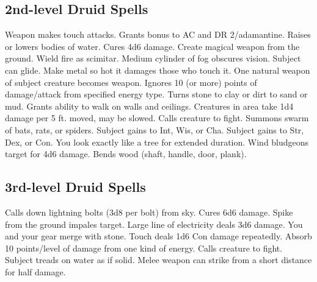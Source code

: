 \subsection{2nd-level Druid Spells}
\begin{spelllist}
   Weapon makes touch attacks. 
   Grants  bonus to AC and DR 2/adamantine.
   Raises or lowers bodies of water.
   Cures 4d6 damage.
   Create magical weapon from the ground.
   Wield fire as scimitar.
   Medium cylinder of fog obscures vision.
   Subject can glide.
   Make metal so hot it damages those who touch it.
   One natural weapon of subject creature becomes  weapon.
   Ignores 10 (or more) points of damage/attack from specified energy type.
   Turns stone to clay or dirt to sand or mud.
   Grants ability to walk on walls and ceilings.
   Creatures in area take 1d4 damage per 5 ft. moved, may be slowed.
   Calls creature to fight.
   Summons swarm of bats, rats, or spiders.
   Subject gains  to Int, Wis, or Cha.
   Subject gains  to Str, Dex, or Con.
   You look exactly like a tree for extended duration.
   Wind bludgeons target for 4d6 damage.
   Bends wood (shaft, handle, door, plank).
\end{spelllist}

\subsection{3rd-level Druid Spells}
\begin{spelllist}
   Calls down lightning bolts (3d8 per bolt) from sky.
   Cures 6d6 damage.
   Spike from the ground impales target.
   Large line of electricity deals 3d6 damage.
   You and your gear merge with stone.
   Touch deals 1d6 Con damage repeatedly.
   Absorb 10 points/level of damage from one kind of energy.
   Calls creature to fight.
   Subject treads on water as if solid.
   Melee weapon can strike from a short distance for half damage.
\end{spelllist}

